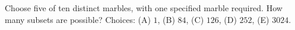 Choose five of ten distinct marbles, with one specified marble required. How many subsets are possible? Choices: (A) $ 1 $, (B) $ 84 $, (C) $ 126 $, (D) $ 252 $, (E) $ 3024 $.
